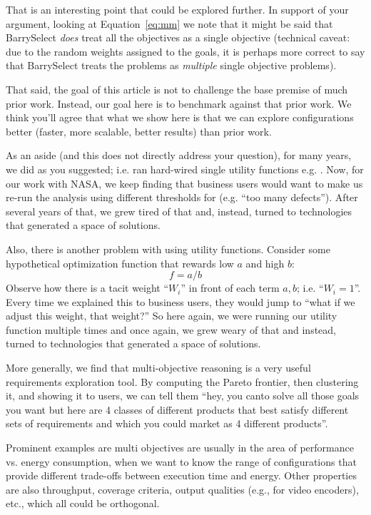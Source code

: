 That is an interesting point that could be explored further. In support of your argument, looking at
Equation~\ref{eq:mm} we note that it might be said that      BarrySelect {\em does} treat all the objectives as a single objective (technical caveat: due to the random weights assigned to the goals, it is perhaps   more correct to say that BarrySelect treats the problems as {\em multiple} single objective problems).

That said, the goal of this article is not to challenge the base premise of much prior work. Instead, our goal here is to benchmark {\flash} against that prior work. We think you'll agree that what we show here
is that we can explore configurations better (faster, more scalable, better results) than prior work.




As an aside (and this does not directly address your question), 
for many years, we did as you suggested; i.e. ran hard-wired single utility functions  e.g. \cite{menzies2007business}. Now, for our work with
NASA, we keep finding that business users would want to make us re-run the analysis using different thresholds for (e.g. ``too many defects''). After several years of that, we grew tired of that and, instead, turned to technologies that generated a space of solutions.

Also, there is another problem with using utility functions. Consider some hypothetical optimization function that rewards low $a$ and high $b$: \[
f= a/b
\]
Observe how there is a tacit weight ``$W_i$''  in front of each term $a,b$; i.e.  ``$W_i=1$''. Every time we explained this to business users, they would jump to ``what if we adjust this weight, that weight?'' So here again, we were running our utility function multiple times and once again, we grew weary of that and instead, turned to technologies that generated a space of solutions.

More generally, we find that multi-objective reasoning is
a very useful  requirements exploration tool. By computing the Pareto
frontier, then clustering it, and showing it to users,
we can tell them  ``hey, you can\textquotesingle to solve all those  goals you want but here are 4 classes of different products that best satisfy different sets of requirements and which you could market as 4 different products''.

Prominent examples are multi objectives are usually in the area of performance vs. energy consumption, when we want to know the range of configurations that provide different trade-offs between execution time and energy. Other properties are also throughput, coverage criteria, output qualities (e.g., for video encoders), etc., which all could be orthogonal.



